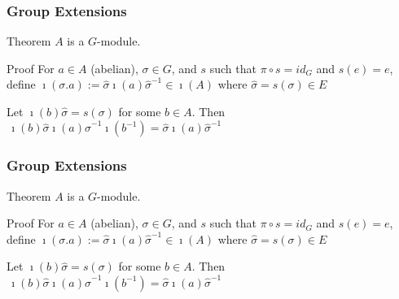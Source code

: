 \documentclass[10pt,xcolor=table,dvipsnames]{beamer}
\begin{document}
\begin{frame}
\frametitle{Group Extensions}
\begin{block}{Theorem}%
$A$ is a $G$-module.
\end{block}

\begin{block}{Proof}%
For $a\in A$ (abelian), $\sigma \in G$, and $s$ such that $\pi \circ s=id_{G}
$ and $s\left( e\right) =e$, define $\imath \left( \sigma .a\right) :=%
\widehat{\sigma }\imath \left( a\right) \widehat{\sigma }^{-1}\in \imath
\left( A\right) $ where $\widehat{\sigma }=s\left( \sigma \right) \in E$

\textcolor{stupid}{Let $\imath \left( b\right) \widehat{\sigma }=s\left( \sigma \right) $ for
some $b\in A$. Then $\,\imath \left( b\right) \widehat{\sigma }\imath \left(
a\right) \widehat{\sigma }^{-1}\imath \left( b^{-1}\right) =\widehat{\sigma }%
\imath \left( a\right) \widehat{\sigma }^{-1}$}
\end{block}

\end{frame}

\begin{frame}
\frametitle{Group Extensions}
\begin{block}{Theorem}%
$A$ is a $G$-module.
\end{block}

\begin{block}{Proof}%
For $a\in A$ (abelian), $\sigma \in G$, and $s$ such that $\pi \circ s=id_{G}
$ and $s\left( e\right) =e$, define $\imath \left( \sigma .a\right) :=%
\widehat{\sigma }\imath \left( a\right) \widehat{\sigma }^{-1}\in \imath
\left( A\right) $ where $\widehat{\sigma }=s\left( \sigma \right) \in E$

Let $\imath \left( b\right) \widehat{\sigma }=s\left( \sigma \right) $ for
some $b\in A$. Then $\,\imath \left( b\right) \widehat{\sigma }\imath \left(
a\right) \widehat{\sigma }^{-1}\imath \left( b^{-1}\right) =\widehat{\sigma }%
\imath \left( a\right) \widehat{\sigma }^{-1}$
\end{block}

\end{frame}
\end{document}
